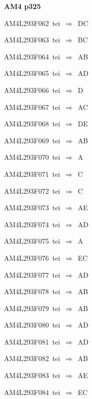 \par\vfill\eject
{\bf\hfill AM4 p325\hfill\hbox{}}\par\bigskip
{\sixrm AM4L293F062\ {\sixit tei}\ }$\Rightarrow$\ DC\par\smallskip
{\sixrm AM4L293F063\ {\sixit tei}\ }$\Rightarrow$\ BC\par\smallskip
{\sixrm AM4L293F064\ {\sixit tei}\ }$\Rightarrow$\ AB\par\smallskip
{\sixrm AM4L293F065\ {\sixit tei}\ }$\Rightarrow$\ AD\par\smallskip
{\sixrm AM4L293F066\ {\sixit tei}\ }$\Rightarrow$\ D\par\smallskip
{\sixrm AM4L293F067\ {\sixit tei}\ }$\Rightarrow$\ AC\par\smallskip
{\sixrm AM4L293F068\ {\sixit tei}\ }$\Rightarrow$\ DE\par\smallskip
{\sixrm AM4L293F069\ {\sixit tei}\ }$\Rightarrow$\ AB\par\smallskip
{\sixrm AM4L293F070\ {\sixit tei}\ }$\Rightarrow$\ A\par\smallskip
{\sixrm AM4L293F071\ {\sixit tei}\ }$\Rightarrow$\ C\par\smallskip
{\sixrm AM4L293F072\ {\sixit tei}\ }$\Rightarrow$\ C\par\smallskip
{\sixrm AM4L293F073\ {\sixit tei}\ }$\Rightarrow$\ AE\par\smallskip
{\sixrm AM4L293F074\ {\sixit tei}\ }$\Rightarrow$\ AD\par\smallskip
{\sixrm AM4L293F075\ {\sixit tei}\ }$\Rightarrow$\ A\par\smallskip
{\sixrm AM4L293F076\ {\sixit tei}\ }$\Rightarrow$\ EC\par\smallskip
{\sixrm AM4L293F077\ {\sixit tei}\ }$\Rightarrow$\ AD\par\smallskip
{\sixrm AM4L293F078\ {\sixit tei}\ }$\Rightarrow$\ AB\par\smallskip
{\sixrm AM4L293F079\ {\sixit tei}\ }$\Rightarrow$\ AB\par\smallskip
{\sixrm AM4L293F080\ {\sixit tei}\ }$\Rightarrow$\ AD\par\smallskip
{\sixrm AM4L293F081\ {\sixit tei}\ }$\Rightarrow$\ AD\par\smallskip
{\sixrm AM4L293F082\ {\sixit tei}\ }$\Rightarrow$\ AB\par\smallskip
{\sixrm AM4L293F083\ {\sixit tei}\ }$\Rightarrow$\ AE\par\smallskip
{\sixrm AM4L293F084\ {\sixit tei}\ }$\Rightarrow$\ EC\par\smallskip

